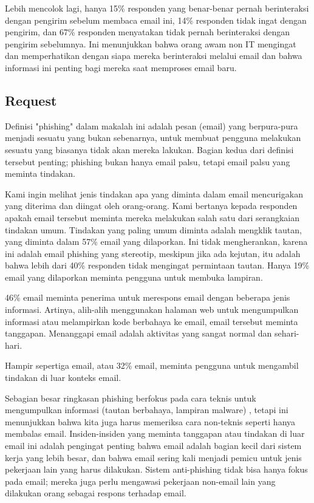 \documentclass[lettersize,journal]{IEEEtran}
\begin{document}
Lebih mencolok lagi, hanya 15\% responden
yang benar-benar pernah berinteraksi dengan pengirim sebelum membaca email ini, 14\% responden
tidak ingat dengan pengirim, dan 67\% responden menyatakan tidak pernah berinteraksi dengan pengirim
sebelumnya. Ini menunjukkan bahwa orang awam non IT mengingat dan memperhatikan dengan
siapa mereka berinteraksi melalui email dan bahwa informasi ini penting bagi
mereka saat memproses email baru.

\subsection{Request}

Definisi "phishing" dalam makalah ini adalah pesan (email) yang berpura-pura
menjadi sesuatu yang bukan sebenarnya, untuk membuat pengguna melakukan sesuatu
yang biasanya tidak akan mereka lakukan. Bagian kedua dari definisi tersebut
penting; phishing bukan hanya email palsu, tetapi email palsu yang meminta
tindakan.

Kami ingin melihat jenis tindakan apa yang diminta dalam email mencurigakan
yang diterima dan diingat oleh orang-orang. Kami bertanya kepada responden
apakah email tersebut meminta mereka melakukan salah satu dari serangkaian
tindakan umum. Tindakan yang paling umum diminta adalah mengklik tautan, yang
diminta dalam 57\% email yang dilaporkan. Ini tidak mengherankan, karena ini
adalah email phishing yang stereotip, meskipun jika ada kejutan, itu adalah
bahwa lebih dari 40\% responden tidak mengingat permintaan tautan. Hanya 19\%
email yang dilaporkan meminta pengguna untuk membuka lampiran.

46\% email meminta penerima untuk merespons email dengan beberapa jenis informasi. 
Artinya, alih-alih menggunakan halaman web untuk mengumpulkan informasi atau 
melampirkan kode berbahaya ke email, email tersebut meminta tanggapan. Menanggapi email adalah aktivitas yang sangat normal dan sehari-hari.

Hampir sepertiga email, atau 32\% email, meminta pengguna untuk mengambil
tindakan di luar konteks email. 

Sebagian besar ringkasan phishing berfokus pada cara teknis untuk mengumpulkan
informasi (tautan berbahaya, lampiran malware) \cite{tigadua}, tetapi ini
menunjukkan bahwa kita juga harus memeriksa cara non-teknis seperti hanya
membalas email. Insiden-insiden yang meminta tanggapan atau tindakan di luar
email ini adalah pengingat penting bahwa email adalah bagian kecil dari sistem
kerja yang lebih besar, dan bahwa email sering kali menjadi pemicu untuk jenis
pekerjaan lain yang harus dilakukan. Sistem anti-phishing tidak bisa hanya
fokus pada email; mereka juga perlu mengawasi pekerjaan non-email lain yang
dilakukan orang sebagai respons terhadap email.
\end{document}
